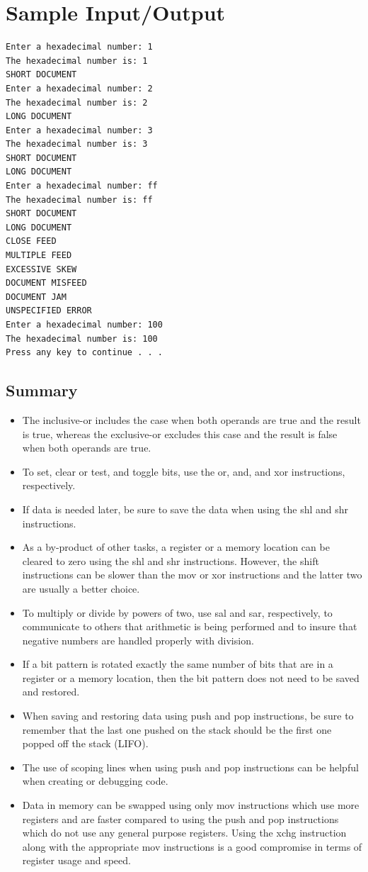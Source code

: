 \documentclass[10pt]{article}
\begin{document}
\section*{Sample Input/Output}
\begin{verbatim}
Enter a hexadecimal number: 1
The hexadecimal number is: 1
SHORT DOCUMENT
Enter a hexadecimal number: 2
The hexadecimal number is: 2
LONG DOCUMENT
Enter a hexadecimal number: 3
The hexadecimal number is: 3
SHORT DOCUMENT
LONG DOCUMENT
Enter a hexadecimal number: ff
The hexadecimal number is: ff
SHORT DOCUMENT
LONG DOCUMENT
CLOSE FEED
MULTIPLE FEED
EXCESSIVE SKEW
DOCUMENT MISFEED
DOCUMENT JAM
UNSPECIFIED ERROR
Enter a hexadecimal number: 100
The hexadecimal number is: 100
Press any key to continue . . .
\end{verbatim}

\subsection*{Summary}
\begin{itemize}
  \item The inclusive-or includes the case when both operands are true and the result is true, whereas the exclusive-or excludes this case and the result is false when both operands are true.
  \item To set, clear or test, and toggle bits, use the or, and, and xor instructions, respectively.
  \item If data is needed later, be sure to save the data when using the shl and shr instructions.
  \item As a by-product of other tasks, a register or a memory location can be cleared to zero using the shl and shr instructions. However, the shift instructions can be slower than the mov or xor instructions and the latter two are usually a better choice.
  \item To multiply or divide by powers of two, use sal and sar, respectively, to communicate to others that arithmetic is being performed and to insure that negative numbers are handled properly with division.
  \item If a bit pattern is rotated exactly the same number of bits that are in a register or a memory location, then the bit pattern does not need to be saved and restored.
  \item When saving and restoring data using push and pop instructions, be sure to remember that the last one pushed on the stack should be the first one popped off the stack (LIFO).
  \item The use of scoping lines when using push and pop instructions can be helpful when creating or debugging code.
  \item Data in memory can be swapped using only mov instructions which use more registers and are faster compared to using the push and pop instructions which do not use any general purpose registers. Using the xchg instruction along with the appropriate mov instructions is a good compromise in terms of register usage and speed.
\end{itemize}
\end{document}
